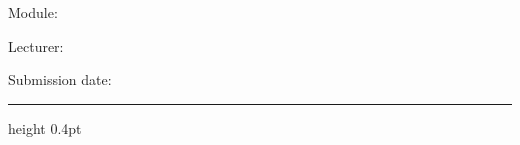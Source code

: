 \thispagestyle{plain}
\begin{center}
  {\LARGE\bfseries \reporttitle\par}
  \vspace{1.0em}
  {\large \reportauthor\par}
  \vspace{0.6em}
  Module: \reportmodule\par
  \reportprogram\par
  Lecturer: \reportlecturer\par
  Submission date: \submissiondate\par
\end{center}
\vspace{0.3em}
\hrule height 0.4pt
\vspace{0.5em}
